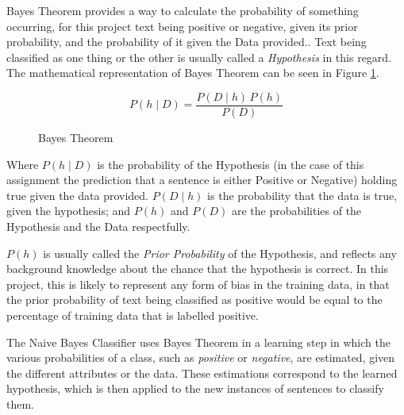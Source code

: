Bayes Theorem provides a way to calculate the probability of something occurring, for this project text being positive or negative, given its prior probability, and the probability of it given the Data provided.\cite{Mitchell1997}. Text being classified as one thing or the other is usually called a \emph{Hypothesis} in this regard. The mathematical representation of Bayes Theorem can be seen in Figure \ref{fig:bayes_theorem}.
\begin{figure}[ht]
$$ P(h \mid D) = \frac{P(D \mid h) \, P(h)}{P(D)} $$
\caption{Bayes Theorem}
\label{fig:bayes_theorem}
\end{figure}

Where $P(h \mid D)$ is the probability of the Hypothesis (in the case of this assignment the prediction that a sentence is either Positive or Negative) holding true given the data provided. $P(D \mid h)$ is the probability that the data is true, given the hypothesis; and $P(h)$ and $P(D)$ are the probabilities of the Hypothesis and the Data respectfully.

$P(h)$ is usually called the \emph{Prior Probability} of the Hypothesis, and reflects any background knowledge about the chance that the hypothesis is correct. In this project, this is likely to represent any form of bias in the training data, in that the prior probability of text being classified as positive would be equal to the percentage of training data that is labelled positive.

The Naive Bayes Classifier uses Bayes Theorem in a learning step in which the various probabilities of a class, such as \emph{positive} or \emph{negative}, are estimated, given the different attributes or the data\cite{Mitchell1997}. These estimations correspond to the learned hypothesis, which is then applied to the new instances of sentences to classify them.

